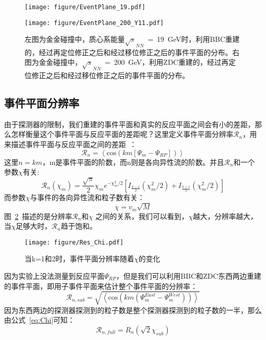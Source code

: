 \begin{figure}[htbp]
\begin{minipage}[t]{0.5\textwidth}
\centering
\texttt{[image: figure/EventPlane\_19.pdf]}
\end{minipage}
\begin{minipage}[t]{0.5\textwidth}
\centering
\texttt{[image: figure/EventPlane\_200\_Y11.pdf]}
\end{minipage}
\caption{左图为金金碰撞中，质心系能量$\sqrt{s}_{NN}$~=~19~GeV时，利用BBC重建的，经过再定位修正之后和经过移位修正之后的事件平面的分布。右图为金金碰撞中，$\sqrt{s}_{NN}$~=~200~GeV，利用ZDC重建的，经过再定位修正之后和经过移位修正之后的事件平面的分布。}
\label{fig:EP_dis_19_200}
\end{figure}

\subsection{事件平面分辨率}
由于探测器的限制，我们重建的事件平面和真实的反应平面之间会有小的差距，那么怎样衡量这个事件平面与反应平面的差距呢？这里定义事件平面分辨率$\mathcal{R}_{n}$，用来描述事件平面与反应平面之间的差距~\cite{Poskanzer:1998yz,Voloshin:2008dg}：
\begin{equation}
\label{eq:Res_EP}
\mathcal{R}_{n} = \left\langle \mathrm{cos}(km[\Psi_{m}-\Psi_{RP}]) \right\rangle
\end{equation}
这里$n=km$，m是事件平面的阶数，而n则是各向异性流的阶数。并且$\mathcal{R}_{n}$和一个参数$\chi$有关:
\begin{equation}
\label{eq:Res_Chi}
\mathcal{R}_{n}(\chi_{m}) = \frac{\sqrt{\pi}}{2}\chi_{m} e^{-\chi_{m}^2/2} \left[ I_{\frac{k-1}{2}}(\chi_{m}^2/2) + I_{\frac{k+1}{2}}(\chi_{m}^2/2) \right]
\end{equation}
而参数$\chi$与事件的各向异性流和粒子数有关：
\begin{equation}
\label{eq:Chi}
\chi = v_{m}\sqrt{M}
\end{equation}
图~\ref{fig:Res_Chi}~\cite{Voloshin:2008dg}描述的是分辨率$\mathcal{R}_{n}$和$\chi$ 之间的关系，我们可以看到，$\chi$越大，分辨率越大，当$\chi$足够大时，$\mathcal{R}_{n}$趋于饱和。
\begin{figure}[htbp]
\centering
\texttt{[image: figure/Res\_Chi.pdf]}
\caption{当k=1和2时，事件平面分辨率随着$\chi$的变化}
\label{fig:Res_Chi}
\end{figure}

因为实验上没法测量到反应平面$\Psi_{RP}$，但是我们可以利用BBC和ZDC东西两边重建的事件平面，即用子事件平面来估计整个事件平面的分辨率：
\begin{equation}
\label{eq:Res_Chi_sub}
\mathcal{R}_{n,sub} = \sqrt{\left\langle \mathrm{cos}(km(\Psi_{m}^{East} - \Psi_{m}^{West})) \right\rangle}
\end{equation}
因为东西两边的探测器探测到的粒子数是整个探测器探测到的粒子数的一半，那么由公式~\ref{eq:Chi}可知：
\begin{equation}
\label{Res_full_sub}
\mathcal{R}_{n,full} = R_{n}(\sqrt{2}\chi_{sub})
\end{equation}

